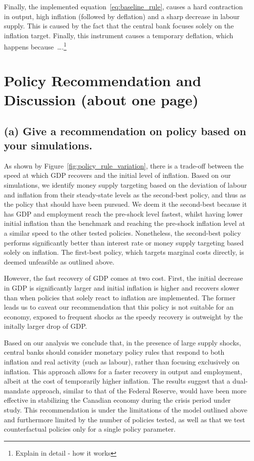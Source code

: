 \documentclass[12pt]{article}
\begin{document}
Finally, the implemented equation~\ref{eq:baseline_rule}, causes a hard contraction in output, high inflation (followed by deflation) and a sharp decrease in labour supply. This is caused by the fact that the central bank focuses solely on the inflation target. Finally, this instrument causes a temporary deflation, which happens because\ \dots.\footnote{Explain in detail - how it works}




\newpage
\section{Policy Recommendation and Discussion (about one page)}
\subsection*{(a) Give a recommendation on policy based on your simulations.}

As shown by Figure~\ref{fig:policy_rule_variation}, there is a trade-off between the speed at which GDP recovers and the initial level of inflation. Based on our simulations, we identify money supply targeting based on the deviation of labour and inflation from their steady-state levels as the second-best policy, and thus as the policy that should have been pursued. We deem it the second-best because it has GDP and employment reach the pre-shock level fastest, whilst having lower initial inflation than the benchmark and reaching the pre-shock inflation level at a similar speed to the other tested policies. Nonetheless, the second-best policy performs significantly better than interest rate or money supply targeting based solely on inflation. The first-best policy, which targets marginal costs directly, is deemed unfeasible as outlined above. 

However, the fast recovery of GDP comes at two cost. First, the initial decrease in GDP is significantly larger and initial inflation is higher and recovers slower than when policies that solely react to inflation are implemented. The former leads us to caveat our recommendation that this policy is not suitable for an economy, exposed to frequent shocks as the speedy recovery is outweight by the initally larger drop of GDP. 

Based on our analysis we conclude that, in the presence of large supply shocks, central banks should consider monetary policy rules that respond to both inflation and real activity (such as labour), rather than focusing exclusively on inflation. This approach allows for a faster recovery in output and employment, albeit at the cost of temporarily higher inflation. The results suggest that a dual-mandate approach, similar to that of the Federal Reserve, would have been more effective in stabilizing the Canadian economy during the crisis period under study. This recommendation is under the limitations of the model outlined above and furthermore limited by the number of policies tested, as well as that we test counterfactual policies only for a single policy parameter. 
\end{document}
